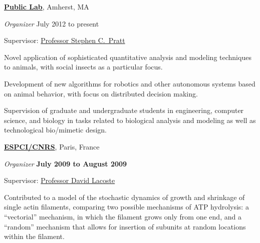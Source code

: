 \documentclass[10pt]{article}
\newcommand{\halfblankline}{\quad\vspace{-0.5\baselineskip}\pagebreak[3]}
\begin{document}
\href{http://www.asu.edu/}{\textbf{Public Lab}},
Amherst, MA
\begin{outerlist}

    \item[] \textit{Organizer}%
            \hfill July 2012 to present
            \begin{innerlist}
                \item Supervisor:
                        \href{http://www.public.asu.edu/~spratt1/}%
                             {Professor Stephen C.~Pratt}

                \item Novel application of sophisticated quantitative
                    analysis and modeling techniques to animals, with
                    social insects as a particular focus.

                \item Development of new algorithms for robotics and
                    other autonomous systems based on animal behavior,
                    with focus on distributed decision making.

                \item Supervision of graduate and undergraduate students
                    in engineering, computer science, and biology in
                    tasks related to biological analysis and modeling as
                    well as technological bio\-/mimetic design.
            \end{innerlist}

\end{outerlist}

\halfblankline


\href{http://www.asu.edu/}{\textbf{ESPCI/CNRS}},
Paris, France
\begin{outerlist}

    \item[] \textit{Organizer}%
            \hfill \textbf{July 2009 to August 2009}
            \begin{innerlist}
                \item Supervisor:
                        \href{http://www.public.asu.edu/~spratt1/}%
                             {Professor David Lacoste}

                \item Contributed to a model of the stochastic dynamics of growth and shrinkage of single actin filaments,
comparing two possible mechanisms of ATP hydrolysis: a “vectorial” mechanism, in which the filament
grows only from one end, and a “random” mechanism that allows for insertion of subunits at random
locations within the filament.
            \end{innerlist}

\end{outerlist}
\end{document}

